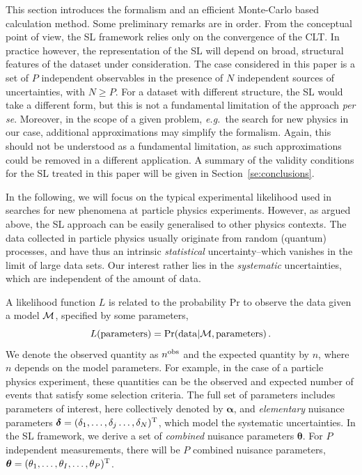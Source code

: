 \documentclass[11pt]{article}
\def\eg{{\it e.g.}}
\newcommand{\be}{\begin{equation}}
\newcommand{\ee}{\end{equation}}
\begin{document}
This section introduces the formalism and an efficient Monte-Carlo based calculation method. 
Some preliminary remarks are in order.  
From the conceptual point of view, the SL framework relies only on the convergence of the CLT. In practice however, 
the representation of the SL will depend on broad, structural features of the dataset under consideration.  
The case considered in this paper is a set of $P$ independent observables in the presence of $N$ 
independent sources of uncertainties, with $N\geq P$.  
For a dataset with different structure, the SL would take a different form, but this  
is not a fundamental limitation of the approach \textit{per se}. 
Moreover, in the scope of a given problem, \eg\ the search for new physics in our case, additional approximations 
may simplify the formalism. Again, this should not be understood as a fundamental limitation, as such approximations  
could be removed in a different application. A summary of the validity conditions for the SL treated in this paper 
will be given in Section~\ref{se:conclusions}.

In the following, we will focus on the typical experimental likelihood used in searches for new phenomena at particle physics experiments. 
However, as argued above, the SL approach can be easily generalised to other physics contexts.
The data collected in particle physics usually originate from random (quantum) processes, and have thus an intrinsic \textit{statistical} uncertainty--which vanishes in the limit of large data sets. Our interest rather lies in the \textit{systematic} uncertainties, which are independent of the amount of data. 

A likelihood function $L$ is related to the probability Pr to observe the data given a model $\cal M$, specified by some parameters,
\be L({\rm parameters})={\rm Pr}({\rm data}|{\cal M},{\rm parameters})\,.\ee
We denote the observed  quantity as $n^{\rm obs}$ and the expected quantity by $n$, where $n$ depends on the model parameters.   For example, in the case of
a particle physics experiment, these quantities can be the observed and expected number of events that satisfy some selection criteria.
The full set of parameters includes parameters of interest, here collectively denoted by $\bm{\alpha}$, and \textit{elementary} nuisance parameters $\bm{\delta}=(\delta_1,\ldots,\delta_{j}\ldots,\delta_N)^{\rm{T}}$, which model the systematic uncertainties.
In the SL framework, we derive a set of \textit{combined} nuisance parameters $\bm{\theta}$. For $P$ independent measurements, there will be $P$ combined nuisance parameters, $\bm{\theta}=(\theta_1,\ldots,\theta_{I},\ldots,\theta_P)^{\rm{T}}$.
\end{document}
